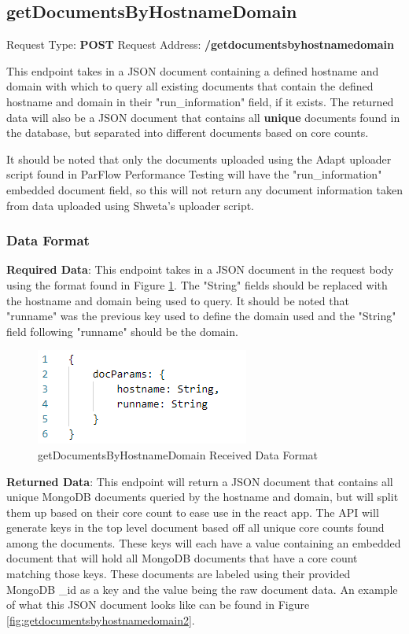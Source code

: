 \subsection{getDocumentsByHostnameDomain}
Request Type: \textbf{POST}
\newline
Request Address: \textbf{/getdocumentsbyhostnamedomain}
\newline

This endpoint takes in a JSON document containing a defined hostname and domain with which to query all existing documents that contain the defined hostname and domain in their "run\_information" field, if it exists. The returned data will also be a JSON document that contains all \textbf{unique} documents found in the database, but separated into different documents based on core counts.

It should be noted that only the documents uploaded using the Adapt uploader script found in ParFlow Performance Testing will have the "run\_information" embedded document field, so this will not return any document information taken from data uploaded using Shweta's uploader script.

\subsubsection{Data Format}
\textbf{Required Data}:
\newline
\newline
This endpoint takes in a JSON document in the request body using the format found in Figure \ref{fig:getdocumentsbyhostnamedomain1}. The "String" fields should be replaced with the hostname and domain being used to query. It should be noted that "runname" was the previous key used to define the domain used and the "String" field following "runname" should be the domain.
\begin{figure}[H]
    \centering
    \includegraphics{img/getdocumentsbyhostnamedomain1.PNG}
    \caption{getDocumentsByHostnameDomain Received Data Format}
    \label{fig:getdocumentsbyhostnamedomain1}
\end{figure}
\textbf{Returned Data}:
\newline
\newline
This endpoint will return a JSON document that contains all unique MongoDB documents queried by the hostname and domain, but will split them up based on their core count to ease use in the react app. The API will generate keys in the top level document based off all unique core counts found among the documents. These keys will each have a value containing an embedded document that will hold all MongoDB documents that have a core count matching those keys. These documents are labeled using their provided MongoDB \_id as a key and the value being the raw document data. An example of what this JSON document looks like can be found in Figure \ref{fig:getdocumentsbyhostnamedomain2}.

